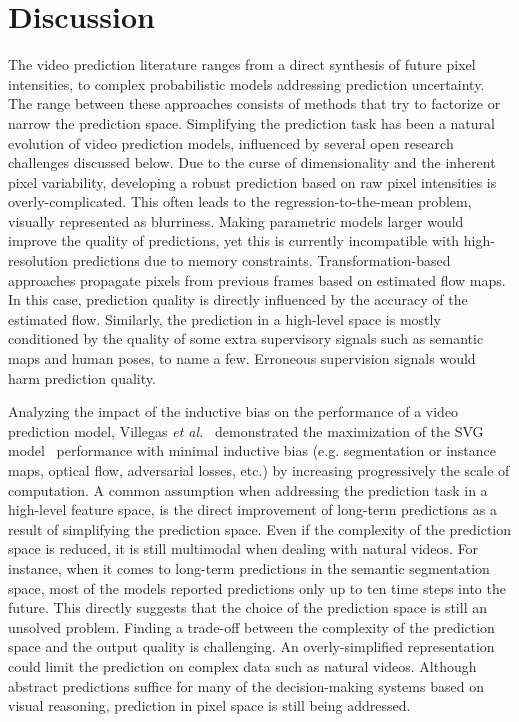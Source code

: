 \section{Discussion}
\label{sec:discussion}
The video prediction literature ranges from a direct synthesis of future pixel intensities, to complex probabilistic models addressing prediction uncertainty. The range between these approaches consists of methods that try to factorize or narrow the prediction space. Simplifying the prediction task has been a natural evolution of video prediction models, influenced by several open research challenges discussed below. Due to the curse of dimensionality and the inherent pixel variability, developing a robust prediction based on raw pixel intensities is overly-complicated. This often leads to the regression-to-the-mean problem, visually represented as blurriness. Making parametric models larger would improve the quality of predictions, yet this is currently incompatible with high-resolution predictions due to memory constraints. Transformation-based approaches propagate pixels from previous frames based on estimated flow maps. In this case, prediction quality is directly influenced by the accuracy of the estimated flow. Similarly, the prediction in a high-level space is mostly conditioned by the quality of some extra supervisory signals such as semantic maps and human poses, to name a few. Erroneous supervision signals would harm prediction quality.

Analyzing the impact of the inductive bias on the performance of a video prediction model, Villegas \textit{et al.}~\cite{Villegas2019} demonstrated the maximization of the \ac{SVG} model~\cite{Denton2018} performance with minimal inductive bias (e.g. segmentation or instance maps, optical flow, adversarial losses, etc.) by increasing progressively the scale of computation. A common assumption when addressing the prediction task in a high-level feature space, is the direct improvement of long-term predictions as a result of simplifying the prediction space. Even if the complexity of the prediction space is reduced, it is still multimodal when dealing with natural videos. For instance, when it comes to long-term predictions in the semantic segmentation space, most of the models reported predictions only up to ten time steps into the future. This directly suggests that the choice of the prediction space is still an unsolved problem. Finding a trade-off between the complexity of the prediction space and the output quality is challenging. An overly-simplified representation could limit the prediction on complex data such as natural videos. Although abstract predictions suffice for many of the decision-making systems based on visual reasoning, prediction in pixel space is still being addressed. 

